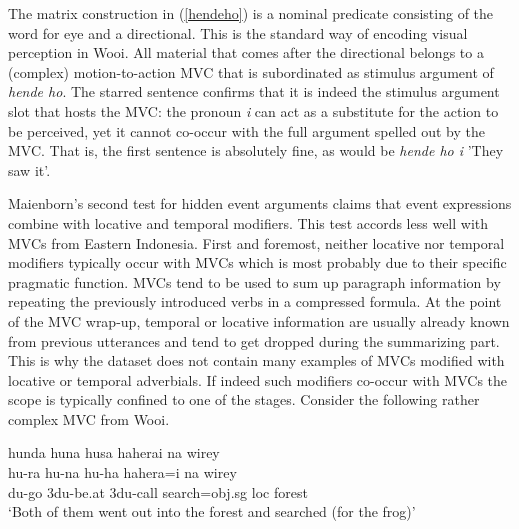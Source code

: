The matrix construction in (\ref{hendeho}) is a nominal predicate consisting of the word for eye and a directional. This is the standard way of encoding visual perception in Wooi. All material that comes after the directional belongs to a (complex) motion-to-action MVC that is subordinated as stimulus argument of \textit{hende ho}. The starred sentence confirms that it is indeed the stimulus argument slot that hosts the MVC: the pronoun \textit{i} can act as a substitute for the action to be perceived, yet it cannot co-occur with the full argument spelled out by the MVC. That is, the first sentence is absolutely fine, as would be \textit{hende ho i} 'They saw it'.

Maienborn's second test for hidden event arguments claims that event expressions combine with locative and temporal modifiers. This test accords less well with MVCs from Eastern Indonesia. First and foremost, neither locative nor temporal modifiers typically occur with MVCs which is most probably due to their specific pragmatic function. MVCs tend to be used to sum up paragraph information by repeating the previously introduced verbs in a compressed formula. At the point of the MVC wrap-up, temporal or locative information are usually already known from previous utterances and tend to get dropped during the summarizing part. This is why the dataset does not contain many examples of MVCs modified with locative or temporal adverbials. If indeed such modifiers co-occur with MVCs the scope is typically confined to one of the stages. Consider the following rather complex MVC from Wooi.

\ea \label{} 
\gll hunda huna husa haherai na wirey \\
hu-ra hu-na hu-ha hahera=i na wirey \\
\acs{du}-go 3\acs{du}-be.at 3\acs{du}-call search=\acs{obj}.\acs{sg} \acs{loc} forest\\
\glft `Both of them went out into the forest and searched (for the frog)' \ 
\z
\xe

